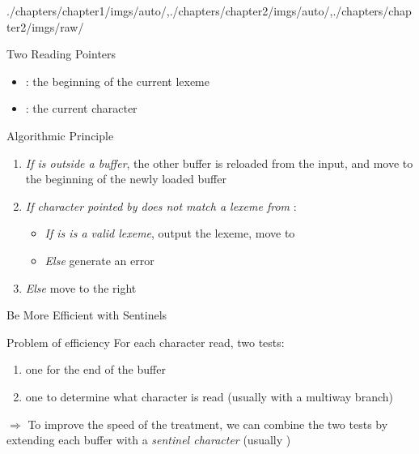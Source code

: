 \begin{graphicspathcontext}{{./chapters/chapter1/imgs/auto/},{./chapters/chapter2/imgs/auto/},{./chapters/chapter2/imgs/raw/}}
\begin{bibunit}[apalike]
\begin{frame}[t]{{Two Reading} Pointers}
	\begin{center}
		{}
	\end{center}
	\begin{itemize}
	\item {}: the beginning of the current lexeme
	\item {}: the current character
	\end{itemize}
	\vspace{.25cm}
	\begin{block}{Algorithmic Principle}
		\begin{enumerate}
			\item \emph{If  is outside a buffer}, the other buffer is reloaded from the input, and move  to the beginning of the newly loaded buffer
			\item \emph{If character pointed by  does not match a lexeme from }:
				\begin{itemize}
					\item \emph{If is is a valid lexeme}, output the lexeme, move  to 
					\item \emph{Else} generate an error
				\end{itemize}
			\item \emph{Else} move  to the right
		\end{enumerate}
	\end{block}
\end{frame}

\begin{frame}{{Be More Efficient} with Sentinels}
	\begin{alertblock}{Problem of efficiency}
		For each character read, two tests: \begin{enumerate}
		\item one for the end of the buffer
		\item one to determine what character is read (usually with a multiway branch)
		\end{enumerate}
	\end{alertblock}
	\vspace{.5cm}
	$\Rightarrow$ To improve the speed of the treatment, we can combine the two tests by extending each buffer with a \emph{sentinel character} (usually ) \\
	\vspace{.5cm}
	\begin{center}
	\end{center}
\end{frame}


\end{bibunit}
\end{graphicspathcontext}

